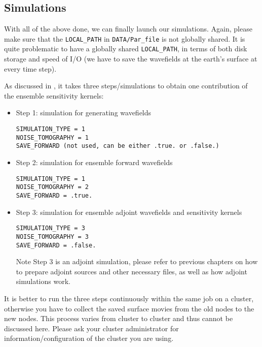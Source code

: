 \subsection{Simulations}

With all of the above done, we can finally launch our simulations.
Again, please make sure that the \texttt{LOCAL\_PATH} in \texttt{DATA/Par\_file}
is not globally shared. It is quite problematic to have a globally
shared \texttt{LOCAL\_PATH}, in terms of both disk storage and speed
of I/O (we have to save the wavefields at the earth's surface at every
time step).

As discussed in \citet{trompetal2010}, it takes three steps/simulations
to obtain one contribution of the ensemble sensitivity kernels:
\begin{itemize}
\item Step 1: simulation for generating wavefields
\begin{verbatim}
SIMULATION_TYPE = 1
NOISE_TOMOGRAPHY = 1
SAVE_FORWARD (not used, can be either .true. or .false.)
\end{verbatim}

\item Step 2: simulation for ensemble forward wavefields
\begin{verbatim}
SIMULATION_TYPE = 1
NOISE_TOMOGRAPHY = 2
SAVE_FORWARD = .true.
\end{verbatim}

\item Step 3: simulation for ensemble adjoint wavefields and sensitivity
kernels
\begin{verbatim}
SIMULATION_TYPE = 3
NOISE_TOMOGRAPHY = 3
SAVE_FORWARD = .false.
\end{verbatim}

Note Step 3 is an adjoint simulation, please refer to previous chapters
on how to prepare adjoint sources and other necessary files, as well
as how adjoint simulations work.

\end{itemize}

It is better to run the three steps continuously within
the same job on a cluster, otherwise you have to collect the saved surface movies
from the old nodes to the new nodes. This process varies
from cluster to cluster and thus cannot be discussed here. Please
ask your cluster administrator for information/configuration of the
cluster you are using.\\



